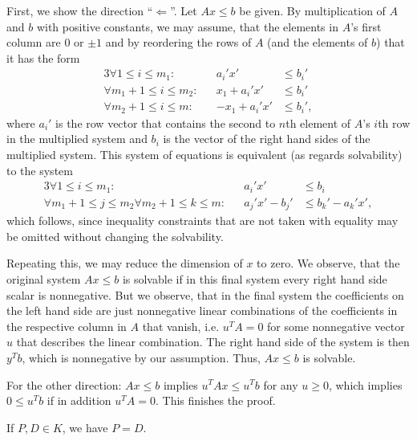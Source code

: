 \documentclass{scrartcl}
\newcommand\1{\mathbf{1}}
\begin{document}
\begin{Proof}
First, we show the direction \enquote{$\Leftarrow$}. Let $Ax \le b$ be given. By multiplication of $A$ and $b$ with positive constants, we may assume, that the elements in $A$'s first column are $0$ or $\pm 1$ and by reordering the rows of $A$ (and the elements of $b$) that it has the form
\begin{alignat*}{3}
\forall 1 \le i \le m_1 \colon &&a_i' x'& \le b_i'\\
\forall m_1+1 \le i \le m_2 \colon &&x_1+a_i' x'& \le b_i'\\
\forall m_2+1 \le i \le m \colon &&-x_1+a_i' x'& \le b_i',
\end{alignat*}
where $a_i'$ is the row vector that contains the second to $n$th element of $A$'s $i$th row in the multiplied system and $b_i$ is the vector of the right hand sides of the multiplied system. This system of equations is equivalent (as regards solvability) to the system
\begin{alignat*}{3}
\forall 1 \le i \le m_1 \colon &&a_i' x'& \le b_i\\
\forall m_1+1 \le j \le m_2 \forall m_2+1 \le k\le m \colon &&a_j' x'-b_j'& \le b_k' - a_k'x',
\end{alignat*}
which follows, since inequality constraints that are not taken with equality may be omitted without changing the solvability. 

Repeating this, we may reduce the dimension of $x$ to zero. We observe, that the original system $Ax \le b$ is solvable if in this final system every right hand side scalar is nonnegative. But we observe, that in the final system the coefficients on the left hand side are just nonnegative linear combinations of the coefficients in the respective column in $A$ that vanish, i.e. $u^TA=0$ for some nonnegative vector $u$ that describes the linear combination. The right hand side of the system is then $y^Tb$, which is nonnegative by our assumption. Thus, $Ax \le b$ is solvable.

For the other direction: $A x \le b$ implies $u^T A x \le u^T b$ for any $u \ge 0$, which implies $0 \le u^T b$ if in addition $u^T A = 0$. This finishes the proof.
\end{Proof}
\begin{Theorem}
If $P, D \in K$, we have $P=D$.
\end{Theorem}
\end{document}
